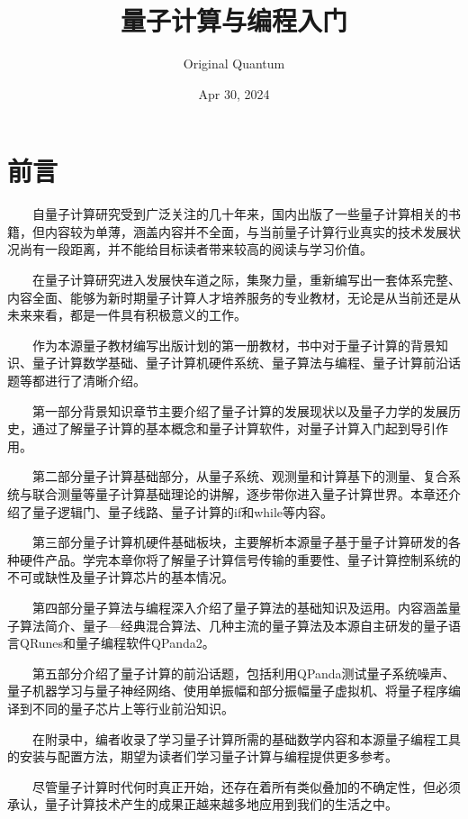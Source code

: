\documentclass[a4paper,11pt,english]{sphinxmanual}
\title{量子计算与编程入门}
\date{Apr 30, 2024}
\author{Original Quantum}
\begin{document}
\pagestyle{empty}
\sphinxmaketitle
\pagestyle{plain}
\sphinxtableofcontents
\pagestyle{normal}
\label{\detokenize{index::doc}}



\chapter{前言}
\label{\detokenize{index:id2}}
\sphinxAtStartPar
  自量子计算研究受到广泛关注的几十年来，国内出版了一些量子计算相关的书籍，但内容较为单薄，涵盖内容并不全面，与当前量子计算行业真实的技术发展状况尚有一段距离，并不能给目标读者带来较高的阅读与学习价值。

\sphinxAtStartPar
  在量子计算研究进入发展快车道之际，集聚力量，重新编写出一套体系完整、内容全面、能够为新时期量子计算人才培养服务的专业教材，无论是从当前还是从未来来看，都是一件具有积极意义的工作。

\sphinxAtStartPar
  作为本源量子教材编写出版计划的第一册教材，书中对于量子计算的背景知识、量子计算数学基础、量子计算机硬件系统、量子算法与编程、量子计算前沿话题等都进行了清晰介绍。

\sphinxAtStartPar
  第一部分背景知识章节主要介绍了量子计算的发展现状以及量子力学的发展历史，通过了解量子计算的基本概念和量子计算软件，对量子计算入门起到导引作用。

\sphinxAtStartPar
  第二部分量子计算基础部分，从量子系统、观测量和计算基下的测量、复合系统与联合测量等量子计算基础理论的讲解，逐步带你进入量子计算世界。本章还介绍了量子逻辑门、量子线路、量子计算的if和while等内容。

\sphinxAtStartPar
  第三部分量子计算机硬件基础板块，主要解析本源量子基于量子计算研发的各种硬件产品。学完本章你将了解量子计算信号传输的重要性、量子计算控制系统的不可或缺性及量子计算芯片的基本情况。

\sphinxAtStartPar
  第四部分量子算法与编程深入介绍了量子算法的基础知识及运用。内容涵盖量子算法简介、量子—经典混合算法、几种主流的量子算法及本源自主研发的量子语言QRunes和量子编程软件QPanda2。

\sphinxAtStartPar
  第五部分介绍了量子计算的前沿话题，包括利用QPanda测试量子系统噪声、量子机器学习与量子神经网络、使用单振幅和部分振幅量子虚拟机、将量子程序编译到不同的量子芯片上等行业前沿知识。

\sphinxAtStartPar
  在附录中，编者收录了学习量子计算所需的基础数学内容和本源量子编程工具的安装与配置方法，期望为读者们学习量子计算与编程提供更多参考。

\sphinxAtStartPar
  尽管量子计算时代何时真正开始，还存在着所有类似叠加的不确定性，但必须承认，量子计算技术产生的成果正越来越多地应用到我们的生活之中。
\end{document}
